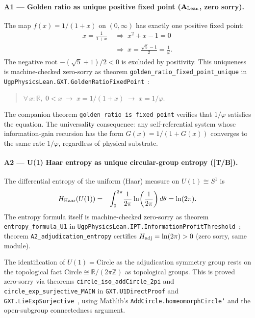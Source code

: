 \documentclass[11pt,twocolumn]{article}
\newcommand{\CatAL}{\ensuremath{\textbf{A}_{\rm Lean}}}
\theoremstyle{remark}
\begin{document}
\paragraph{A1 — Golden ratio as unique positive fixed point ($\CatAL$, zero sorry).}
The map $f(x) = 1/(1+x)$ on $(0,\infty)$ has exactly one positive fixed point:
\begin{align*}
  x = \frac{1}{1+x}
  &\;\Longrightarrow\; x^2 + x - 1 = 0 \\
  &\;\Longrightarrow\; x = \frac{\sqrt{5}-1}{2} = \frac{1}{\varphi}.
\end{align*}
The negative root $-(\sqrt{5}+1)/2 < 0$ is excluded by positivity.  This
uniqueness is machine-checked zero-sorry as theorem
\texttt{golden\_ratio\_fixed\_point\_unique} in
\texttt{UgpPhysicsLean.\allowbreak{}GXT.\allowbreak{}GoldenRatioFixedPoint}~\cite{SpivackUGPPhysicsLean}:
\begin{quote}\small
  $\forall\, x{:}\mathbb{R},\; 0 < x \;\to\; x = 1/(1+x) \;\to\; x = 1/\varphi.$
\end{quote}
The companion theorem \texttt{golden\_ratio\_is\_fixed\_point} verifies that
$1/\varphi$ satisfies the equation.  The universality consequence: any
self-referential system whose information-gain recursion has the form
$G(x) = 1/(1+G(x))$ converges to the same rate $1/\varphi$, regardless of
physical substrate.

\paragraph{A2 — U(1) Haar entropy as unique circular-group entropy (\textbf{[T/B]}).}
The differential entropy of the uniform (Haar) measure on
$U(1) \cong S^1$ is
\[
  H_{\rm Haar}(U(1))
  = -\!\int_0^{2\pi}\!\frac{1}{2\pi}\ln\!\left(\frac{1}{2\pi}\right)d\theta
  = \ln(2\pi).
\]
The entropy formula itself is machine-checked zero-sorry as theorem
\texttt{entropy\_formula\_U1} in
\texttt{UgpPhysicsLean.\allowbreak{}IPT.\allowbreak{}InformationProfitThreshold}~\cite{SpivackUGPPhysicsLean};
theorem \texttt{A2\_adjudication\_entropy} certifies $H_{\rm adj} = \ln(2\pi) > 0$
(zero sorry, same module).

The identification of $U(1) = \mathrm{Circle}$ as the adjudication symmetry
group rests on the topological fact $\mathrm{Circle} \cong \mathbb{R}/(2\pi\mathbb{Z})$
as topological groups.  This is proved zero-sorry via theorems
\texttt{circle\_iso\_addCircle\_2pi} and \texttt{circle\_exp\_surjective\_MAIN}
in \texttt{GXT.\allowbreak{}U1DirectProof} and
\texttt{GXT.\allowbreak{}LieExpSurjective}~\cite{SpivackUGPPhysicsLean},
using Mathlib's \texttt{AddCircle.homeomorphCircle'} and the open-subgroup
connectedness argument.
\end{document}
